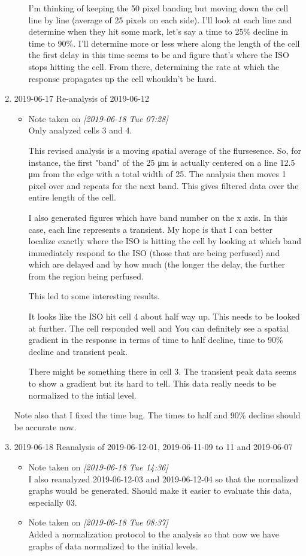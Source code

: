 \documentclass[11pt]{article}
\begin{document}
\begin{enumerate}
\begin{itemize}
I'm thinking of keeping the 50 pixel banding but moving down the cell line by line (average of 25 pixels on each side).  I'll look at each line and determine when they hit some mark, let's say a time to 25\% decline in time to 90\%.  I'll determine more or less where along the length of the cell the first delay in this time seems to be and figure that's where the ISO stops hitting the cell.  From there, determining the rate at which the response propagates up the cell whouldn't be hard.
\end{itemize}
\item 2019-06-17 Re-analysis of 2019-06-12
\label{sec:org73bc3ee}
\begin{itemize}
\item Note taken on \textit{[2019-06-18 Tue 07:28] } \\
Only analyzed cells 3 and 4.

This revised analysis is a moving spatial average of the flursesence.  So, for instance, the first "band" of the 25 μm is actually centered on a line 12.5 μm from the edge with a total width of 25.  The analysis then moves 1 pixel over and repeats for the next band.  This gives filtered data over the entire length of the cell.

I also generated figures which have band number on the x axis.  In this case, each line represents a transient.  My hope is that I can better localize exactly where the ISO is hitting the cell by looking at which band immediately respond to the ISO (those that are being perfused) and which are delayed and by how much (the longer the delay, the further from the region being perfused.

This led to some interesting results.

It looks like the ISO hit cell 4 about half way up.  This needs to be looked at further.  The cell responded well and You can definitely see a spatial gradient in the response in terms of time to half decline, time to 90\% decline and transient peak.

There might be something there in cell 3.  The transient peak data seems to show a gradient but its hard to tell.  This data really needs to be normalized to the intial level.
\end{itemize}

Note also that I fixed the time bug.  The times to half and 90\% decline should be accurate now.
\item 2019-06-18 Reanalysis of 2019-06-12-01, 2019-06-11-09 to 11 and 2019-06-07
\label{sec:org16bd6b2}
\begin{itemize}
\item Note taken on \textit{[2019-06-18 Tue 14:36] } \\
I also reanalyzed 2019-06-12-03 and 2019-06-12-04 so that the normalized graphs would be generated.  Should make it easier to evaluate this data, especially 03.
\item Note taken on \textit{[2019-06-18 Tue 08:37] } \\
Added a normalization protocol to the analysis so that now we have graphs of data normalized to the initial levels.


\end{itemize}
\end{enumerate}
\end{document}
